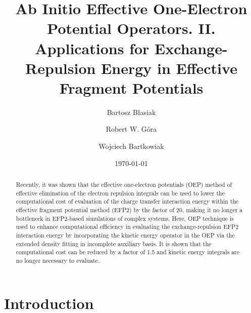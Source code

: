 


\title{Ab Initio Effective One-Electron Potential Operators. II.
Applications for Exchange-Repulsion Energy in Effective Fragment Potentials}

\author{Bartosz B{\l}asiak}

\author{Robert W. G{\'o}ra}
\author{Wojciech Bartkowiak}


\date{\today}

\begin{abstract}
Recently, it was shown that
the effective one\hyp{}electron potentials (OEP) method
of effective elimination of the electron repulsion integrals
can be used to lower the computational cost
of evaluation of the charge transfer interaction energy
within the effective fragment potential method (EFP2)
by the factor of 20, making it no longer a bottleneck
in EFP2\hyp{}based simulations of complex systems.
Here, OEP technique 
is used to enhance computational efficiency in evaluating the
exchange\hyp{}repulsion EFP2 interaction energy
by incorporating the kinetic energy operator in the OEP
via the extended density fitting in incomplete auxiliary basis.
It is shown that the computational cost can be reduced by a factor
of 1.5 and kinetic energy integrals are no longer necessary to evaluate.
\end{abstract}

\pacs{}

\maketitle

\tableofcontents

\section{\label{s:1.introduction}Introduction}

